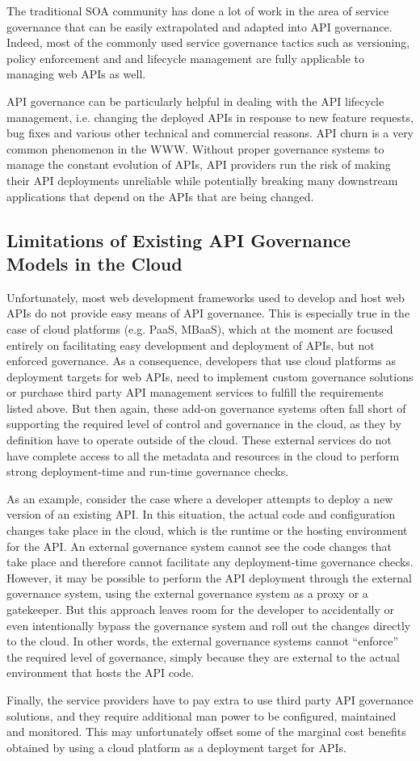 The traditional SOA community has done a lot of work in the area of service governance that can be easily extrapolated and adapted into
API governance. Indeed, most of the commonly used service governance tactics such as versioning, policy enforcement and and lifecycle
management are fully applicable to managing web APIs as well.

API governance can be particularly helpful in dealing with the API lifecycle management, i.e. changing the deployed APIs in response to new
feature requests, bug fixes and various other technical and commercial reasons. API churn is a very common phenomenon in the WWW. Without
proper governance systems to manage the constant evolution of APIs, API providers run the risk of making their API deployments unreliable
while potentially breaking many downstream applications that depend on the APIs that are being changed.

\subsection{Limitations of Existing API Governance Models in the Cloud}
Unfortunately, most web development frameworks used to develop and host web APIs do not provide easy means of API governance. This is
especially true in the case of cloud platforms (e.g. PaaS, MBaaS), which at the moment are focused entirely on facilitating easy development
and deployment of APIs, but not enforced governance. As a consequence, developers that use cloud platforms as deployment targets for web APIs, 
need to implement custom governance solutions or purchase third party API management services to fulfill the requirements listed above. But 
then again, these add-on governance
systems often fall short of supporting the required level of control and governance in the cloud, as they by definition have to operate outside of the
cloud. These external services do not have complete access to all the metadata and resources in the cloud to perform strong deployment-time and
run-time governance checks. 

As an example, consider the case where a developer attempts to deploy a new version of an existing API. In this
situation, the actual code and configuration changes take place in the cloud, which is the runtime or the hosting environment for the API. An 
external governance system cannot see the code changes that take place and therefore cannot facilitate any deployment-time governance checks.
However, it may be possible to perform the API deployment through the external governance system, using the external governance system
as a proxy or a gatekeeper. But this approach leaves room for the developer to accidentally
or even intentionally bypass the governance system and roll out the changes directly to the cloud. In other words, the external governance systems
cannot ``enforce'' the required level of governance, simply because they are external to the actual environment that hosts the API code.

Finally, the service providers have to pay extra to use third party API governance solutions, and they require
additional man power to be configured, maintained and monitored. This may unfortunately offset some of the marginal cost benefits obtained
by using a cloud platform as a deployment target for APIs.